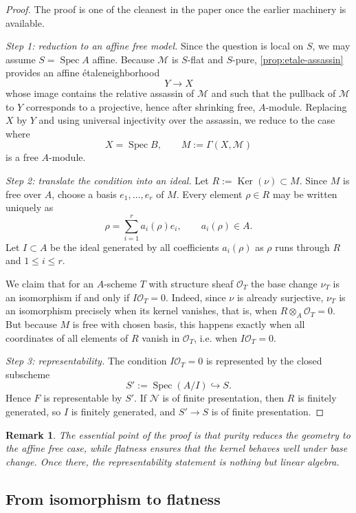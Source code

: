 \documentclass[11pt,oneside]{article}
\newtheorem{remark}[theorem]{Remark}
\newcommand{\M}{\mathcal M}
\newcommand{\N}{\mathcal N}
\newcommand{\OO}{\mathcal O}
\newcommand{\Spec}{\operatorname{Spec}}
\newcommand{\Ker}{\operatorname{Ker}}
\newcommand{\ot}{\otimes}
\newcommand{\etale}{\'etale}
\begin{document}
\begin{proof}
The proof is one of the cleanest in the paper once the earlier machinery is available.

\smallskip
\noindent\emph{Step 1: reduction to an affine free model.}
Since the question is local on $S$, we may assume $S=\Spec A$ affine.  Because $\M$ is $S$-flat and $S$-pure, \cref{prop:etale-assassin} provides an affine \etale neighborhood
\[
Y\to X
\]
whose image contains the relative assassin of $\M$ and such that the pullback of $\M$ to $Y$ corresponds to a projective, hence after shrinking free, $A$-module.  Replacing $X$ by $Y$ and using universal injectivity over the assassin, we reduce to the case where
\[
X=\Spec B,\qquad M:=\Gamma(X,\M)
\]
is a free $A$-module.

\smallskip
\noindent\emph{Step 2: translate the condition into an ideal.}
Let $R:=\Ker(\nu)\subset M$.  Since $M$ is free over $A$, choose a basis $e_1,\dots,e_r$ of $M$.  Every element $\rho\in R$ may be written uniquely as
\[
\rho = \sum_{i=1}^r a_i(\rho)e_i,
\qquad a_i(\rho)\in A.
\]
Let $I\subset A$ be the ideal generated by all coefficients $a_i(\rho)$ as $\rho$ runs through $R$ and $1\le i\le r$.

We claim that for an $A$-scheme $T$ with structure sheaf $\OO_T$ the base change $\nu_T$ is an isomorphism if and only if $I\OO_T=0$.  Indeed, since $\nu$ is already surjective, $\nu_T$ is an isomorphism precisely when its kernel vanishes, that is, when $R\ot_A\OO_T=0$.  But because $M$ is free with chosen basis, this happens exactly when all coordinates of all elements of $R$ vanish in $\OO_T$, i.e. when $I\OO_T=0$.

\smallskip
\noindent\emph{Step 3: representability.}
The condition $I\OO_T=0$ is represented by the closed subscheme
\[
S':=\Spec(A/I)\hookrightarrow S.
\]
Hence $F$ is representable by $S'$.  If $\N$ is of finite presentation, then $R$ is finitely generated, so $I$ is finitely generated, and $S'\to S$ is of finite presentation.
\end{proof}

\begin{remark}
The essential point of the proof is that purity reduces the geometry to the affine free case, while flatness ensures that the kernel behaves well under base change.  Once there, the representability statement is nothing but linear algebra.
\end{remark}

\subsection{From isomorphism to flatness}
\end{document}
